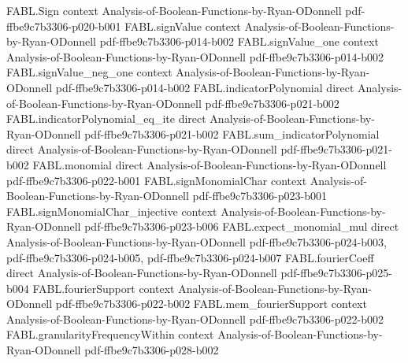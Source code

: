 \begin{theorem}
\label{FABL.noiseStability_le_rho_of_balanced}
\leanok
{}
\proofstep
  {FABL.Sign}
  {context}
  {Analysis-of-Boolean-Functions-by-Ryan-ODonnell}
  {pdf-ffbe9c7b3306-p020-b001}
\proofstep
  {FABL.signValue}
  {context}
  {Analysis-of-Boolean-Functions-by-Ryan-ODonnell}
  {pdf-ffbe9c7b3306-p014-b002}
\proofstep
  {FABL.signValue_one}
  {context}
  {Analysis-of-Boolean-Functions-by-Ryan-ODonnell}
  {pdf-ffbe9c7b3306-p014-b002}
\proofstep
  {FABL.signValue_neg_one}
  {context}
  {Analysis-of-Boolean-Functions-by-Ryan-ODonnell}
  {pdf-ffbe9c7b3306-p014-b002}
\proofstep
  {FABL.indicatorPolynomial}
  {direct}
  {Analysis-of-Boolean-Functions-by-Ryan-ODonnell}
  {pdf-ffbe9c7b3306-p021-b002}
\proofstep
  {FABL.indicatorPolynomial_eq_ite}
  {direct}
  {Analysis-of-Boolean-Functions-by-Ryan-ODonnell}
  {pdf-ffbe9c7b3306-p021-b002}
\proofstep
  {FABL.sum_indicatorPolynomial}
  {direct}
  {Analysis-of-Boolean-Functions-by-Ryan-ODonnell}
  {pdf-ffbe9c7b3306-p021-b002}
\proofstep
  {FABL.monomial}
  {direct}
  {Analysis-of-Boolean-Functions-by-Ryan-ODonnell}
  {pdf-ffbe9c7b3306-p022-b001}
\proofstep
  {FABL.signMonomialChar}
  {context}
  {Analysis-of-Boolean-Functions-by-Ryan-ODonnell}
  {pdf-ffbe9c7b3306-p023-b001}
\proofstep
  {FABL.signMonomialChar_injective}
  {context}
  {Analysis-of-Boolean-Functions-by-Ryan-ODonnell}
  {pdf-ffbe9c7b3306-p023-b006}
\proofstep
  {FABL.expect_monomial_mul}
  {direct}
  {Analysis-of-Boolean-Functions-by-Ryan-ODonnell}
  {pdf-ffbe9c7b3306-p024-b003,
    pdf-ffbe9c7b3306-p024-b005,
    pdf-ffbe9c7b3306-p024-b007}
\proofstep
  {FABL.fourierCoeff}
  {direct}
  {Analysis-of-Boolean-Functions-by-Ryan-ODonnell}
  {pdf-ffbe9c7b3306-p025-b004}
\proofstep
  {FABL.fourierSupport}
  {context}
  {Analysis-of-Boolean-Functions-by-Ryan-ODonnell}
  {pdf-ffbe9c7b3306-p022-b002}
\proofstep
  {FABL.mem_fourierSupport}
  {context}
  {Analysis-of-Boolean-Functions-by-Ryan-ODonnell}
  {pdf-ffbe9c7b3306-p022-b002}
\proofstep
  {FABL.granularityFrequencyWithin}
  {context}
  {Analysis-of-Boolean-Functions-by-Ryan-ODonnell}
  {pdf-ffbe9c7b3306-p028-b002}

\end{theorem}
